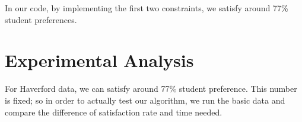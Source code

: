 \documentclass[11pt, oneside]{article}   	%
\begin{document}
In our code, by implementing the first two constraints, we satisfy around 77\% student preferences.



\section{Experimental Analysis}

For Haverford data, we can satisfy around 77\% student preference. This number is fixed; so in order to actually test our algorithm, we run the basic data and compare the difference of satisfaction rate and time needed.
\end{document}
